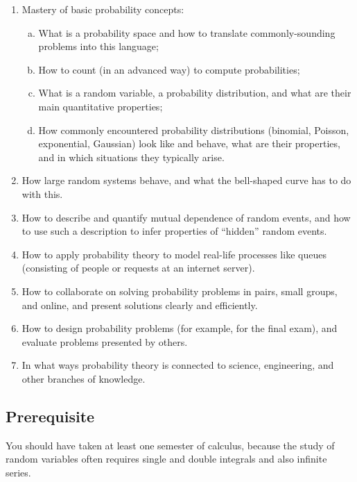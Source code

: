 \documentclass[oneside,11pt]{amsart}
\begin{document}
\begin{enumerate}[\bf{}1.]
	\item Mastery of basic probability concepts:
	\begin{enumerate}[(a)]
		\item What is a probability space and how to translate commonly-sounding problems into this language;
		\item How to count (in an advanced way) to compute probabilities;
		\item What is a random variable, a probability distribution,
		and what are their main quantitative properties;
		\item 
		How commonly encountered probability 
		distributions (binomial, Poisson, exponential, Gaussian) look like and behave,
		what are 
		their properties, and in which situations they typically arise.
	\end{enumerate}

	\item How large random systems behave, and what the 
	bell-shaped curve
	has to do with this.
	\item How to describe and quantify mutual dependence of random events,
	and how to use such a description 
	to infer properties of ``hidden'' random events.
	\item How to apply probability theory to model real-life processes like queues
	(consisting of people or requests at an internet server).
	\item How to collaborate on solving probability problems in pairs, small groups, and online,
	and present solutions clearly and efficiently.
	\item How to design probability problems (for example, for the 
	final exam), and evaluate problems presented by others.
	\item In what ways probability theory is connected to science,
	engineering, and other branches of knowledge.
\end{enumerate}

\subsection*{Prerequisite} You should have taken at least one semester of calculus, because
the study of random variables often requires single and double integrals
and also infinite series.
\end{document}

